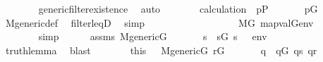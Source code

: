 \begin{isabellebody}
\ \ \ \ \ \ \isamarkupfalse%
\ generic{\isacharunderscore}{\kern0pt}filter{\isacharunderscore}{\kern0pt}existence\ \isamarkupfalse%
\ auto\isanewline
\ \ \ \ \isamarkupfalse%
\ \isamarkupfalse%
\ calculation\ {}\ {\isacartoucheopen}p{\isasymin}P{\isacartoucheclose}\ \isanewline
\ \ \ \ \isamarkupfalse%
\ {\isachardoublequoteopen}p{\isasymin}G{\isachardoublequoteclose}\ \isanewline
\ \ \ \ \ \ \isamarkupfalse%
\ M{\isacharunderscore}{\kern0pt}generic{\isacharunderscore}{\kern0pt}def\ \isamarkupfalse%
\ filter{\isacharunderscore}{\kern0pt}leqD\ \isamarkupfalse%
\ simp\isanewline
\ \ \ \ \isamarkupfalse%
\ \isamarkupfalse%
\ {}\isanewline
\ \ \ \ \isamarkupfalse%
\isanewline
\ \ \ \ \isamarkupfalse%
\ {\isachardoublequoteopen}M{\isacharbrackleft}{\kern0pt}G{\isacharbrackright}{\kern0pt}{\isacharcomma}{\kern0pt}\ map{\isacharparenleft}{\kern0pt}val{\isacharparenleft}{\kern0pt}G{\isacharparenright}{\kern0pt}{\isacharcomma}{\kern0pt}env{\isacharparenright}{\kern0pt}\ {\isasymTurnstile}\ {\isasymphi}{\isachardoublequoteclose}\isanewline
\ \ \ \ \ \ \isamarkupfalse%
\ simp\isanewline
\ \ \ \ \isamarkupfalse%
\ assms\ {\isacartoucheopen}M{\isacharunderscore}{\kern0pt}generic{\isacharparenleft}{\kern0pt}G{\isacharparenright}{\kern0pt}{\isacartoucheclose}\ \isanewline
\ \ \ \ \isamarkupfalse%
\ s\ \ {\isachardoublequoteopen}s{\isasymin}G{\isachardoublequoteclose}\ {\isachardoublequoteopen}{\isacharparenleft}{\kern0pt}s\ {\isasymtturnstile}\ {\isasymphi}\ env{\isacharparenright}{\kern0pt}{\isachardoublequoteclose}\isanewline
\ \ \ \ \ \ \isamarkupfalse%
\ truth{\isacharunderscore}{\kern0pt}lemma\ \isamarkupfalse%
\ blast\isanewline
\ \ \ \ \isamarkupfalse%
\ \isamarkupfalse%
\ this\ \ \ {\isacartoucheopen}M{\isacharunderscore}{\kern0pt}generic{\isacharparenleft}{\kern0pt}G{\isacharparenright}{\kern0pt}{\isacartoucheclose}\ {\isacartoucheopen}r{\isasymin}G{\isacartoucheclose}\ \isanewline
\ \ \ \ \isamarkupfalse%
\ q\ \ {\isachardoublequoteopen}q{\isasymin}G{\isachardoublequoteclose}\ {\isachardoublequoteopen}q{\isasympreceq}s{\isachardoublequoteclose}\ {\isachardoublequoteopen}q{\isasympreceq}r{\isachardoublequoteclose}\isanewline
\ \ \ \ \ \ \isamarkupfalse%

\end{isabellebody}
